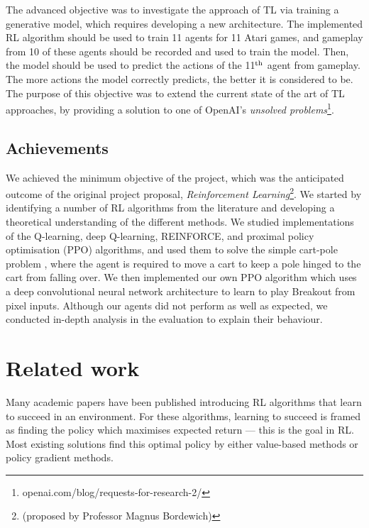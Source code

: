 \documentclass[12pt,a4paper]{article}
\begin{document}
The advanced objective was to investigate the approach of TL via training a generative model, which requires developing a new architecture. The implemented RL algorithm should be used to train 11 agents for 11 Atari games, and gameplay from 10 of these agents should be recorded and used to train the model. Then, the model should be used to predict the actions of the 11$\textsuperscript{th}$ agent from gameplay. The more actions the model correctly predicts, the better it is considered to be. The purpose of this objective was to extend the current state of the art of TL approaches, by providing a solution to one of OpenAI's \emph{unsolved problems}\footnote{openai.com/blog/requests-for-research-2/}.   

\subsection{Achievements}
We achieved the minimum objective of the project, which was the anticipated outcome of the original project proposal, \emph{Reinforcement Learning}\footnote{(proposed by Professor Magnus Bordewich)}. We started by identifying a number of RL algorithms from the literature and developing a theoretical understanding of the different methods. We studied implementations of the Q-learning, deep Q-learning, REINFORCE, and proximal policy optimisation (PPO) algorithms, and used them to solve the simple cart-pole problem \cite{sutton2018reinforcement}, where the agent is required to move a cart to keep a pole hinged to the cart from falling over. We then implemented our own PPO algorithm which uses a deep convolutional neural network architecture to learn to play Breakout from pixel inputs. Although our agents did not perform as well as expected, we conducted in-depth analysis in the evaluation to explain their behaviour.    

\section{Related work}
Many academic papers have been published introducing RL algorithms that learn to succeed in an environment. For these algorithms, learning to succeed is framed as finding the policy which maximises expected return --- this is the goal in RL. Most existing solutions find this optimal policy by either value-based methods or policy gradient methods. 
\end{document}
